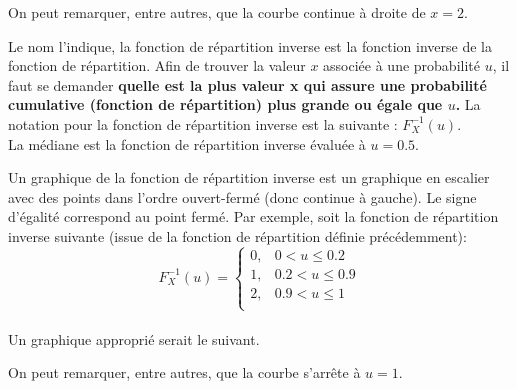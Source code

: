\documentclass[10pt, french]{article}
\begin{document}
\begin{multicols*}{2}
\begin{definitionNOHFILLsub}
On peut remarquer, entre autres, que la courbe continue à droite de $x = 2$.
\end{definitionNOHFILLsub}

\begin{definitionNOHFILLsub}
Le nom l'indique, la fonction de répartition inverse est la fonction inverse de la fonction de répartition. Afin de trouver la valeur $x$ associée à une probabilité $u$, il faut se demander \textbf{quelle est la plus valeur x qui assure une probabilité cumulative (fonction de répartition) plus grande ou égale que $u$.} La notation pour la fonction de répartition inverse est la suivante : $F_X^{-1}(u)$. \\

La médiane est la fonction de répartition inverse évaluée à $u = 0.5$.

Un graphique de la fonction de répartition inverse est un graphique en escalier avec des points dans l'ordre ouvert-fermé (donc continue à gauche). Le signe d'égalité correspond au point fermé. Par exemple, soit la fonction de répartition inverse suivante (issue de la fonction de répartition définie précédemment):\\

$$F^{-1}_X(u) = 
    \left\{
    	\begin{array}{ll}
    		0, & 0 < u \leq 0.2\\
    		1,  &  0.2 < u \leq 0.9\\
    		2, & 0.9 < u \leq 1\\
    	\end{array}
    \right.
    $$\\
    
Un graphique approprié serait le suivant.\\

\begin{center}
\end{center}

On peut remarquer, entre autres, que la courbe s'arrête à $u = 1$.\\


\end{definitionNOHFILLsub}
\end{multicols*}
\end{document}
